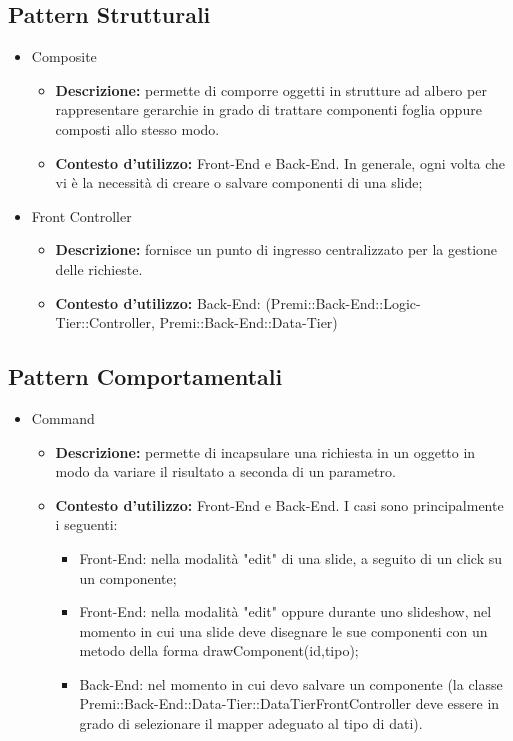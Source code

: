 	\subsection{Pattern Strutturali}
		\begin{itemize}
			\item Composite
			\begin{itemize}
				\item \textbf{Descrizione:} permette di comporre oggetti in strutture ad albero per rappresentare gerarchie in grado di trattare componenti foglia oppure composti allo stesso modo.   
				\item \textbf{Contesto d'utilizzo:} \gls{Front-End} e \gls{Back-End}. In generale, ogni volta che vi è la necessità di creare o salvare componenti di una \gls{slide}; 
			\end{itemize}
		\end{itemize}
		\begin{itemize}
			\item Front Controller
			\begin{itemize}
				\item \textbf{Descrizione:} fornisce un punto di ingresso centralizzato per la gestione delle richieste.
				\item \textbf{Contesto d'utilizzo:} \gls{Back-End}: (Premi::\gls{Back-End}::Logic-Tier::Controller, Premi::\gls{Back-End}::Data-Tier)
			\end{itemize}
		\end{itemize}

	\subsection{Pattern Comportamentali}
		\begin{itemize}
			\item Command
			\begin{itemize}
				\item \textbf{Descrizione:} permette di incapsulare una richiesta in un oggetto in modo da variare il risultato a seconda di un parametro.
				\item \textbf{Contesto d'utilizzo:} \gls{Front-End} e \gls{Back-End}. I casi sono principalmente i seguenti:
				\begin{itemize}
					\item \gls{Front-End}: nella modalità "edit" di una \gls{slide}, a seguito di un click su un componente;
					\item \gls{Front-End}: nella modalità "edit" oppure durante uno slideshow, nel momento in cui una \gls{slide} deve disegnare le sue componenti con un metodo della forma drawComponent(id,tipo);
					\item \gls{Back-End}: nel momento in cui devo salvare un componente (la classe Premi::\gls{Back-End}::Data-Tier::DataTierFrontController deve essere in grado di selezionare il mapper adeguato al tipo di dati).
				\end{itemize}
			\end{itemize}
		\end{itemize}
